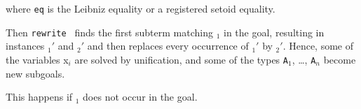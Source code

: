 \noindent where \texttt{eq} is the Leibniz equality or a registered
setoid equality.

\noindent Then {\tt rewrite \term} finds the first subterm matching
\term$_1$ in the goal, resulting in instances \term$_1'$ and \term$_2'$
and then replaces every occurrence of \term$_1'$ by \term$_2'$.
Hence, some of the variables x$_i$ are
solved by unification, and some of the types \texttt{A}$_1$, \dots,
\texttt{A}$_n$ become new subgoals.


\begin{ErrMsgs}
\item {}

\item {}

This happens if \term$_1$ does not occur in the goal.
\end{ErrMsgs}

